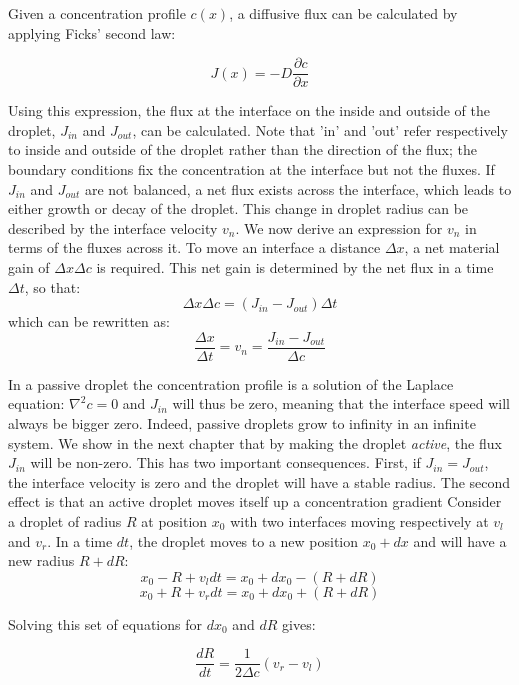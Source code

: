 \documentclass{Dissertate}
\begin{document}
Given a concentration profile \(c(x)\), a diffusive flux can be
calculated by applying Ficks' second law:

\[
J(x) = -D\frac{\partial c}{\partial x}
\]

Using this expression, the flux at the interface on the inside and
outside of the droplet, \(J_{in}\) and \(J_{out}\), can be calculated.
Note that 'in' and 'out' refer respectively to inside and outside of the
droplet rather than the direction of the flux; the boundary conditions
fix the concentration at the interface but not the fluxes. If $J_{in}$ and $J_{out}$ are not balanced, a net flux exists across
the interface, which leads to either growth or decay of the droplet. This change in droplet radius can be described by the interface velocity \(v_n\). We now
derive an expression for \(v_n\) in terms of the fluxes across it. To
move an interface a distance \(\Delta x\), a net material gain of
\(\Delta x \Delta c\) is required. This net gain is determined by the net flux
in a time \(\Delta t\), so that: \[
\Delta x \Delta c = (J_{in}-J_{out})\Delta t
\] which can be rewritten as: \begin{equation}
\frac{\Delta x}{\Delta t} = v_n = \frac{J_{in}-J_{out}}{\Delta c}
\label{eq:interfacespeed}\end{equation} 

In a passive droplet the concentration profile is a solution of the Laplace equation: $\nabla^2c=0$ and $J_{in}$ will thus be zero, meaning that the interface speed will always be bigger zero. Indeed, passive droplets grow to infinity in an infinite system. We show in the next chapter that by making the droplet \emph{active}, the flux $J_{in}$ will be non-zero. This has two important consequences. First, if $J_{in}=J_{out}$, the interface velocity is zero and the droplet will have a stable radius. The second effect is that an active droplet moves itself up a concentration gradient
Consider a droplet of radius \(R\) at position \(x_0\) with two interfaces moving respectively at \(v_l\) and \(v_r\). In a time \(dt\), the droplet moves to a new position \(x_0+dx\) and will have a new radius \(R+dR\): 
\[
x_0-R+v_ldt=x_0+dx_0-(R+dR)
\] \[
x_0+R+v_rdt=x_0+dx_0+(R+dR)
\]

Solving this set of equations for \(dx_0\) and \(dR\) gives:

\begin{equation}
\frac{dR}{dt}=\frac{1}{2\Delta c}(v_r-v_l)
\label{eq:radius}\end{equation}
\end{document}

